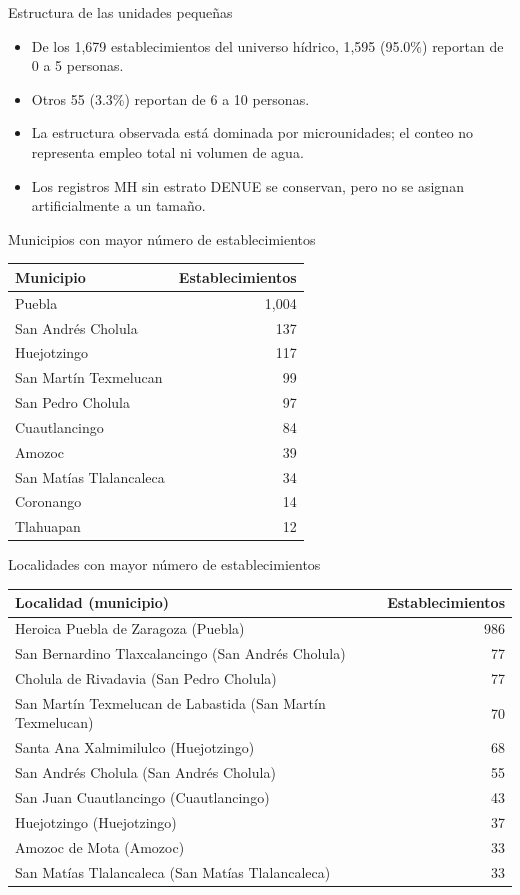 \documentclass[aspectratio=169]{beamer}
\begin{document}
\begin{frame}{Estructura de las unidades pequeñas}
\begin{itemize}
\item De los 1,679 establecimientos del universo hídrico,
1,595 (95.0\%) reportan de 0 a 5 personas.
\item Otros 55 (3.3\%) reportan de 6 a 10 personas.
\item La estructura observada está dominada por microunidades; el conteo no representa empleo total ni volumen de agua.
\item Los registros MH sin estrato DENUE se conservan, pero no se asignan artificialmente a un tamaño.
\end{itemize}
\end{frame}
\begin{frame}{Municipios con mayor número de establecimientos}
\centering\small
\begin{tabular}{lr}\toprule Municipio & Establecimientos\\\midrule
Puebla & 1,004\\
San Andrés Cholula & 137\\
Huejotzingo & 117\\
San Martín Texmelucan & 99\\
San Pedro Cholula & 97\\
Cuautlancingo & 84\\
Amozoc & 39\\
San Matías Tlalancaleca & 34\\
Coronango & 14\\
Tlahuapan & 12\\
\bottomrule\end{tabular}
\end{frame}
\begin{frame}{Localidades con mayor número de establecimientos}
\centering\scriptsize
\begin{tabular}{lr}\toprule Localidad (municipio) & Establecimientos\\\midrule
Heroica Puebla de Zaragoza (Puebla) & 986\\
San Bernardino Tlaxcalancingo (San Andrés Cholula) & 77\\
Cholula de Rivadavia (San Pedro Cholula) & 77\\
San Martín Texmelucan de Labastida (San Martín Texmelucan) & 70\\
Santa Ana Xalmimilulco (Huejotzingo) & 68\\
San Andrés Cholula (San Andrés Cholula) & 55\\
San Juan Cuautlancingo (Cuautlancingo) & 43\\
Huejotzingo (Huejotzingo) & 37\\
Amozoc de Mota (Amozoc) & 33\\
San Matías Tlalancaleca (San Matías Tlalancaleca) & 33\\
\bottomrule\end{tabular}
\end{frame}
\end{document}
